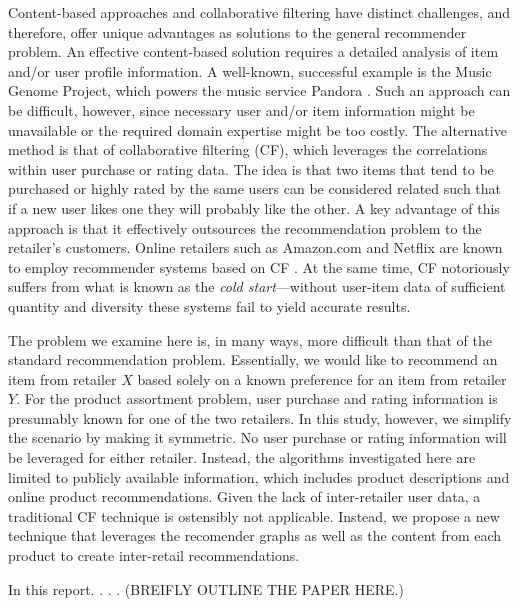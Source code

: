 \documentclass[11pt]{article}
\begin{document}
Content-based approaches and collaborative filtering have distinct challenges,
and therefore, offer unique advantages as solutions to the general recommender
problem.  An effective content-based solution requires a detailed analysis of
item and/or user profile information. A well-known, successful example is the
Music Genome Project, which powers the music service Pandora \cite{mgp}. Such an
approach can be difficult, however, since necessary user and/or item information
might be unavailable or the required domain expertise might be too costly. The
alternative method is that of collaborative filtering (CF), which leverages the
correlations within user purchase or rating data. The idea is that two items
that tend to be purchased or highly rated by the same users can be considered
related such that if a new user likes one they will probably like the other. A
key advantage of this approach is that it effectively outsources the
recommendation problem to the retailer's customers. Online retailers such as
Amazon.com and Netflix are known to employ recommender systems based on CF
\cite{Koren2009}. At the same time, CF notoriously suffers from what is known as
the {\em cold start}---without user-item data of sufficient quantity and
diversity these systems fail to yield accurate results.

The problem we examine here is, in many ways, more difficult than that of the
standard recommendation problem. Essentially, we would like to recommend an item
from retailer $X$ based solely on a known preference for an item from retailer
$Y$. For the product assortment problem, user purchase and rating information is
presumably known for one of the two retailers. In this study, however, we
simplify the scenario by making it symmetric. No user purchase or rating
information will be leveraged for either retailer. Instead, the algorithms
investigated here are limited to publicly available information, which includes
product descriptions and online product recommendations. Given the lack of
inter-retailer user data, a traditional CF technique is ostensibly not
applicable. Instead, we propose a new technique that leverages the recomender
graphs as well as the content from each product to create inter-retail
recommendations.

In this report. . . . (BREIFLY OUTLINE THE PAPER HERE.)
\end{document}
